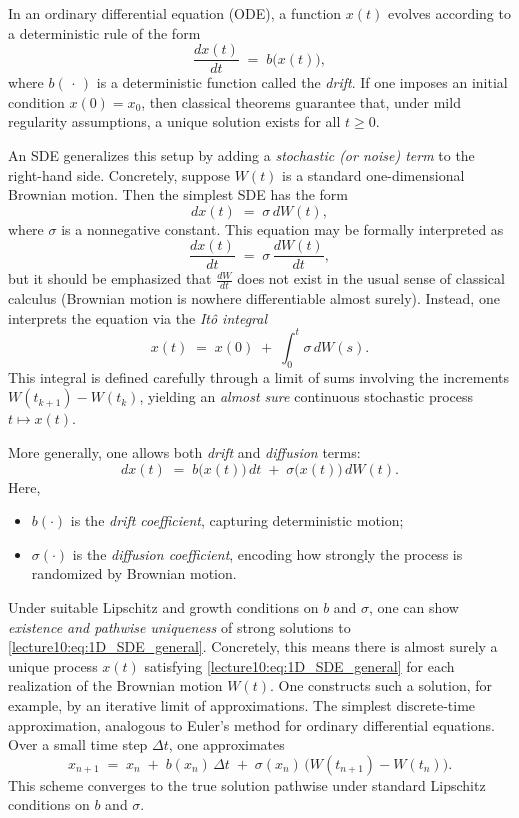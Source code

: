 \documentclass[letterpaper,11pt,oneside,reqno]{book}
\numberwithin{equation}{chapter}  %
\theoremstyle{definition}
\begin{document}
In an ordinary differential equation (ODE), a function \(x(t)\) evolves according to a deterministic rule of the form
\[
\frac{dx(t)}{dt} \;=\; b\bigl(x(t)\bigr),
\]
where \(b(\,\cdot\,)\) is a deterministic function called the \emph{drift}. If one imposes an initial condition \(x(0)=x_0\), then classical theorems guarantee that, under mild regularity assumptions, a unique solution exists for all \(t\ge0\).

An SDE generalizes this setup by adding a \emph{stochastic (or noise) term} to the right-hand side. Concretely, suppose \(W(t)\) is a standard one-dimensional Brownian motion. Then the simplest SDE has the form
\[
dx(t) \;=\; \sigma\, dW(t),
\]
where \(\sigma\) is a nonnegative constant. This equation may be formally interpreted as
\[
\frac{dx(t)}{dt} \;=\; \sigma\,\frac{dW(t)}{dt},
\]
but it should be emphasized that \(\tfrac{dW}{dt}\) does not exist in the usual sense of classical calculus (Brownian motion is nowhere differentiable almost surely). Instead, one interprets the equation via the \emph{It\^{o} integral}
\[
x(t) \;=\; x(0)\;+\;\int_0^t \sigma\, dW(s).
\]
This integral is defined carefully through a limit of sums involving the increments \(W(t_{k+1})-W(t_k)\), yielding an \emph{almost sure} continuous stochastic process \(t\mapsto x(t)\).

\medskip
More generally, one allows both \emph{drift} and \emph{diffusion} terms:
\begin{equation}
\label{lecture10:eq:1D_SDE_general}
dx(t) \;=\; b\bigl(x(t)\bigr)\,dt \;+\; \sigma\bigl(x(t)\bigr)\,dW(t).
\end{equation}
Here,
\begin{itemize}
\item \(b(\cdot)\) is the \emph{drift coefficient}, capturing deterministic motion;
\item \(\sigma(\cdot)\) is the \emph{diffusion coefficient}, encoding how strongly the process is randomized by Brownian motion.
\end{itemize}
Under suitable Lipschitz and growth conditions on \(b\) and \(\sigma\), one can show \emph{existence and pathwise uniqueness} of strong solutions to \eqref{lecture10:eq:1D_SDE_general}. Concretely, this means there is almost surely a unique process \(x(t)\) satisfying \eqref{lecture10:eq:1D_SDE_general} for each realization of the Brownian motion \(W(t)\). One constructs such a solution, for example, by an iterative limit of approximations.
The simplest discrete-time approximation, analogous to Euler’s method for ordinary differential equations. Over a small time step \(\Delta t\), one approximates
\[
x_{n+1} \;=\; x_n \;+\; b(x_n)\,\Delta t \;+\; \sigma(x_n)\,\bigl(W(t_{n+1}) - W(t_n)\bigr).
\]
This scheme converges to the true solution pathwise under standard Lipschitz conditions on \(b\) and \(\sigma\).
\end{document}
